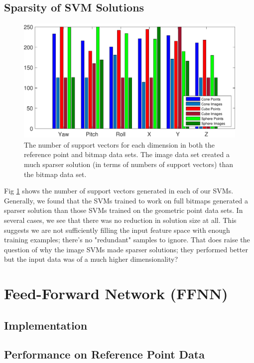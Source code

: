 \documentclass[journal]{IEEEtran}
\begin{document}
\subsection{Sparsity of SVM Solutions}
\begin{figure}[H]
	\hspace{-10 ex}

	\centering
	\includegraphics[width=0.9\linewidth]{supportVectors}

	\caption{The number of support vectors for each dimension in both the reference point and bitmap data sets. The image data set created a much sparser solution (in terms of numbers of support vectors) than the bitmap data set.}
	\label{supportVectors}
\end{figure}

Fig \ref{supportVectors} shows the number of support vectors generated in each of our SVMs. Generally, we found that the SVMs trained to work on full bitmaps generated a sparser solution than those SVMs trained on the geometric point data sets. In several cases, we see that there was no reduction in solution size at all. This suggests we are not sufficiently filling the input feature space with enough training examples; there's no "redundant" samples to ignore. That does raise the question of why the image SVMs made sparser solutions; they performed better but the input data was of a much higher dimensionality?


\section{Feed-Forward Network (FFNN)}

\subsection{Implementation}

\subsection{Performance on Reference Point Data}
\end{document}
